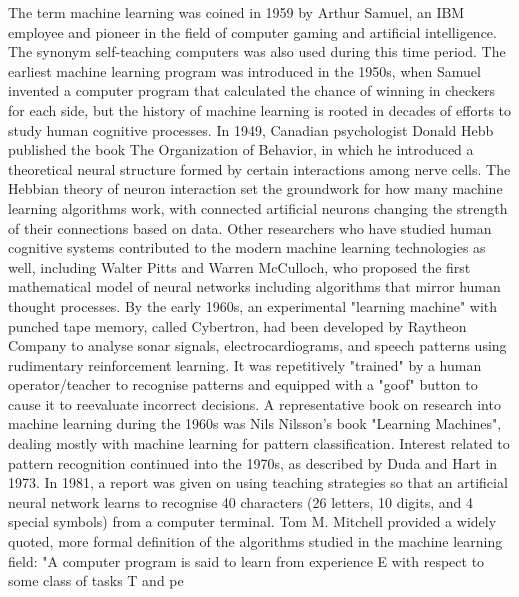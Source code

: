 \documentclass[12pt,a4paper]{report}
\begin{document}
The term machine learning was coined in 1959 by Arthur Samuel, an IBM employee and pioneer in the field of computer gaming and artificial intelligence. The synonym self-teaching computers was also used during this time period.
The earliest machine learning program was introduced in the 1950s, when Samuel invented a computer program that calculated the chance of winning in checkers for each side, but the history of machine learning is rooted in decades of efforts to study human cognitive processes. In 1949, Canadian psychologist Donald Hebb published the book The Organization of Behavior, in which he introduced a theoretical neural structure formed by certain interactions among nerve cells. The Hebbian theory of neuron interaction set the groundwork for how many machine learning algorithms work, with connected artificial neurons changing the strength of their connections based on data. Other researchers who have studied human cognitive systems contributed to the modern machine learning technologies as well, including  Walter Pitts and Warren McCulloch, who proposed the first mathematical model of neural networks including algorithms that mirror human thought processes.
By the early 1960s, an experimental "learning machine" with punched tape memory, called Cybertron, had been developed by Raytheon Company to analyse sonar signals, electrocardiograms, and speech patterns using rudimentary reinforcement learning. It was repetitively "trained" by a human operator/teacher to recognise patterns and equipped with a "goof" button to cause it to reevaluate incorrect decisions. A representative book on research into machine learning during the 1960s was Nils Nilsson's book "Learning Machines", dealing mostly with machine learning for pattern classification. Interest related to pattern recognition continued into the 1970s, as described by Duda and Hart in 1973. In 1981, a report was given on using teaching strategies so that an artificial neural network learns to recognise 40 characters (26 letters, 10 digits, and 4 special symbols) from a computer terminal.
Tom M. Mitchell provided a widely quoted, more formal definition of the algorithms studied in the machine learning field: "A computer program is said to learn from experience E with respect to some class of tasks T and pe
\end{document}
